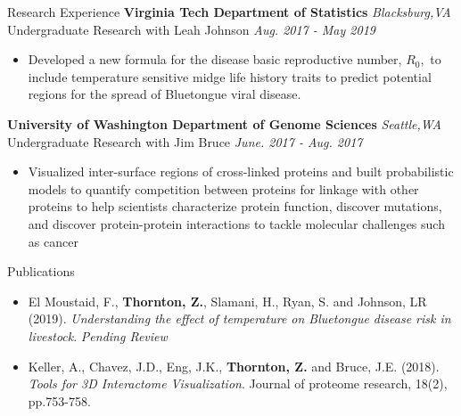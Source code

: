 \documentclass{resume} %
\begin{document}
\begin{rSection}{Research Experience}
{\bf Virginia Tech Department of Statistics} \hfill { \em Blacksburg,VA}\\
{Undergraduate Research with Leah Johnson} \hfill {\em Aug. 2017 - May 2019}
\begin{itemize}
    \item Developed a new formula for the disease basic reproductive number, $R_0,$ to include temperature sensitive midge life history traits to predict potential regions for the spread of Bluetongue viral disease.
\end{itemize}

\newpage

{\bf University of Washington Department of Genome Sciences} \hfill { \em Seattle,WA}\\
{Undergraduate Research with Jim Bruce} \hfill {\em June. 2017 - Aug. 2017}
\begin{itemize}
    \item Visualized inter-surface regions of cross-linked proteins and built probabilistic models to quantify competition between proteins for linkage with other proteins to help scientists characterize protein function, discover mutations, and discover protein-protein interactions to tackle molecular challenges such as cancer
\end{itemize}

\end{rSection}

\begin{rSection}{Publications}

\begin{itemize}

  \item El Moustaid, F., \textbf{Thornton, Z.}, Slamani, H., Ryan, S. and Johnson, LR (2019). \textit{Understanding the effect of temperature on Bluetongue disease risk in livestock}. \textit{Pending Review}

    \item Keller, A., Chavez, J.D., Eng, J.K., \textbf{Thornton, Z.} and Bruce, J.E. (2018). \textit{Tools for 3D Interactome Visualization}. Journal of proteome research, 18(2), pp.753-758.
\end{itemize}

\end{rSection}
\end{document}
